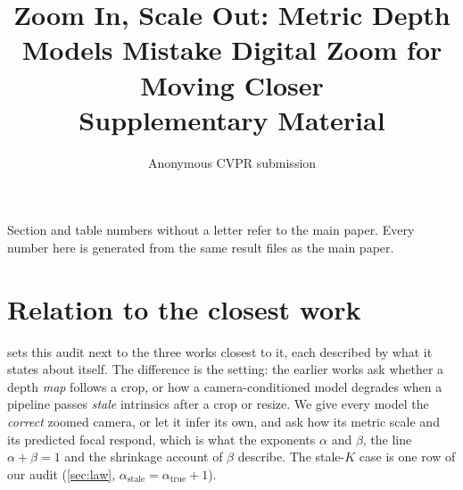 \documentclass[10pt,twocolumn,letterpaper]{article}
\title{Zoom In, Scale Out: Metric Depth Models Mistake Digital Zoom for Moving Closer\\[2pt]
\large Supplementary Material}
\author{Anonymous CVPR submission}
\begin{document}
\maketitle
\sloppy

Section and table numbers without a letter refer to the main paper. Every number here is generated
from the same result files as the main paper.

\section{Relation to the closest work}\label{sec:supp_related}

 sets this audit next to the three works closest to it, each described by what it states
about itself. The difference is the setting: the earlier works ask whether a depth \emph{map} follows a crop, or
how a camera-conditioned model degrades when a pipeline passes \emph{stale} intrinsics after a crop or resize.
We give every model the \emph{correct} zoomed camera, or let it infer its own, and ask how its metric scale and
its predicted focal respond, which is what the exponents $\alpha$ and $\beta$, the line $\alpha+\beta=1$ and the
shrinkage account of $\beta$ describe. The stale-$K$ case is one row of our audit
(\cref{sec:law}, $\alpha_{\text{stale}}=\alpha_{\text{true}}+1$).
\end{document}
